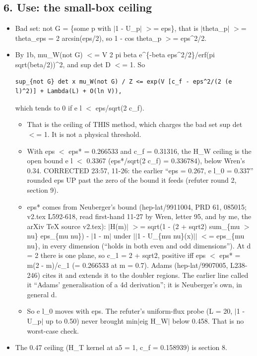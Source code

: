 \documentclass[11pt,a4paper]{article}
\begin{document}
\subsection*{6. Use: the small-box ceiling}
\begin{itemize}
\item{} Bad set: not G = \{some p with $|$1 - U\_p$|$ $>$= eps\}, that is $|$theta\_p$|$ $>$= theta\_eps = 2 arcsin(eps/2), so
1 - cos theta\_p $>$= eps\textasciicircum{}2/2.
\item{} By 1b, mu\_W(not G) $<$= V 2 pi beta e\textasciicircum{}\{-beta eps\textasciicircum{}2/2\}/erf(pi sqrt(beta/2))\textasciicircum{}2, and sup det D $<$= 1. So
\begin{Verbatim}[breaklines=true,breakanywhere=true,fontsize=\small]
sup_{not G} det x mu_W(not G) / Z <= exp(V [c_f - eps^2/(2 (e l)^2)] + Lambda(L) + O(ln V)),
\end{Verbatim}

which tends to 0 if e l $<$ eps/sqrt(2 c\_f).
\begin{itemize}
\item{} That is the ceiling of THIS method, which charges the bad set sup det $<$= 1. It is not a physical threshold.
\item{} With eps $<$ eps* = 0.266533 and c\_f = 0.31316, the H\_W ceiling is the open bound e l $<$ 0.3367 (eps*/sqrt(2 c\_f) =
0.336784), below Wren's 0.34. CORRECTED 23:57, 11-26: the earlier ``eps = 0.267, e l\_0 = 0.337'' rounded eps UP past
the zero of the bound it feeds (refuter round 2, section 9).
\item{} eps* comes from Neuberger's bound (hep-lat/9911004, PRD 61, 085015; v2.tex L592-618, read first-hand 11-27 by
Wren, letter 95, and by me, the arXiv TeX source v2.tex):
$|$H(m)$|$ $>$= sqrt(1 - (2 + sqrt2) sum\_\{mu $>$ nu\} eps\_\{mu nu\}) - $|$1 - m$|$ under $|$$|$1 - U\_\{mu nu\}(x)$|$$|$ $<$= eps\_\{mu nu\}, in
every dimension (``holds in both even and odd dimensions''). At d = 2 there is one plane, so c\_1 = 2 + sqrt2, positive
iff eps $<$ eps* = m(2 - m)/c\_1 (= 0.266533 at m = 0.7). Adams (hep-lat/9907005, L238-246) cites it and extends it to
the doubler regions. The earlier line called it ``Adams' generalisation of a 4d derivation''; it is Neuberger's own,
in general d.
\item{} So e l\_0 moves with eps. The refuter's uniform-flux probe (L = 20, $|$1 - U\_p$|$ up to 0.50) never brought
min$|$eig H\_W$|$ below 0.458. That is no worst-case check.
\end{itemize}

\item{} The 0.47 ceiling (H\_T kernel at a5 = 1, c\_f = 0.158939) is section 8.
\end{itemize}
\end{document}
